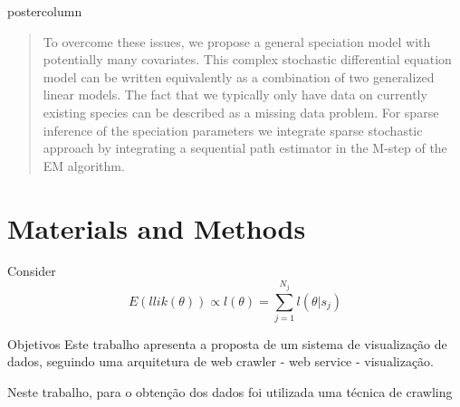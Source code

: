 \documentclass[final,hyperref={pdfpagelabels=false}]{beamer}
\begin{document}
\begin{frame}
\begin{columns}
\begin{column}{.49\textwidth}
\begin{beamercolorbox}[center,wd=\textwidth]{postercolumn}
\begin{minipage}[T]{.95\textwidth}
{\begin{abstract}
To overcome these issues, we propose a general speciation model with potentially many covariates. This complex stochastic differential equation model can be written equivalently as a combination of two generalized linear models. The fact that we typically only have data on currently existing species can be described as a missing data problem. For sparse inference of the speciation parameters we integrate sparse stochastic approach by integrating a sequential path estimator in the M-step of the EM algorithm.


\end{abstract}
            \section*{Materials and Methods}
            Consider 
            $$ E(llik(\theta)) \propto  l(\theta)=\displaystyle\sum_{j=1}^{N_j} l(\theta | s_j) $$
            \begin{block}{Objetivos}
             Este trabalho apresenta a proposta de um sistema de visualização de dados, seguindo uma arquitetura de web crawler - web service - visualização. 
             
Neste trabalho, para o obtenção dos dados foi utilizada uma técnica de crawling 
		

\end{block}}
\end{minipage}
\end{beamercolorbox}
\end{column}
\end{columns}
\end{frame}
\end{document}

